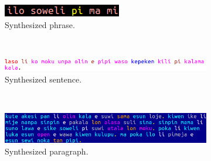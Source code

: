 \begin{figure}     \center
  \begin{subfigure}{.5\textwidth}
    \centering
        \includegraphics[width=.8\linewidth]{figs/phrase_}\vspace{-0.15cm}
          \caption{Synthesized phrase.}
            \label{fig:sfig1}
  \end{subfigure}\\\vspace{0.3cm}
  \begin{subfigure}{.9\textwidth}
    \centering
        \includegraphics[width=1\linewidth]{figs/sentence_}\vspace{-0.15cm}
          \caption{Synthesized sentence.}
            \label{fig:sfig2}
  \end{subfigure}\\\vspace{0.3cm}
  \begin{subfigure}{.8\textwidth}
    \centering
        \includegraphics[width=\linewidth]{figs/paragraph_}\vspace{-0.15cm}
          \caption{Synthesized paragraph.}
            \label{fig:sfig2}
  \end{subfigure}\\\vspace{0.3cm}
  \begin{subfigure}{.6\textwidth}
    \centering

\end{subfigure}
\end{figure}
